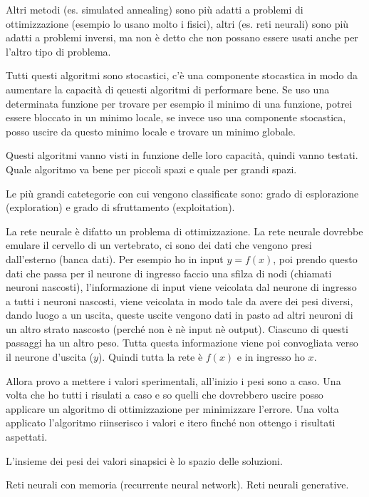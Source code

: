 Altri metodi (es. simulated annealing) sono più adatti a problemi di ottimizzazione (esempio lo usano 
molto i fisici), altri (es. reti neurali) sono più adatti a problemi inversi, ma non è detto che non 
possano essere usati anche per l'altro tipo di problema.

Tutti questi algoritmi sono stocastici, c'è una componente stocastica in modo da aumentare la 
capacità di qeuesti algoritmi di performare bene.
Se uso una determinata funzione per trovare per esempio il minimo di una funzione, 
potrei essere bloccato in un minimo locale, se invece uso una componente stocastica, 
posso uscire da questo minimo locale e trovare un minimo globale.

Questi algoritmi vanno visti in funzione delle loro capacità, quindi vanno testati.
Quale algoritmo va bene per piccoli spazi e quale per grandi spazi.

Le più grandi catetegorie con cui vengono classificate sono:
grado di esplorazione (exploration) e grado di sfruttamento (exploitation).

La rete neurale è difatto un problema di ottimizzazione.
La rete neurale dovrebbe emulare il cervello di un vertebrato, ci sono dei dati che 
vengono presi dall'esterno (banca dati).
Per esempio ho in input $y=f(x)$, poi prendo questo dati che passa per il neurone di ingresso
faccio una sfilza di nodi (chiamati neuroni nascosti), l'informazione di input viene
veicolata dal neurone di ingresso a tutti i neuroni nascosti, viene veicolata in modo tale
da avere dei pesi diversi, dando luogo a un uscita, queste uscite vengono dati in pasto
ad altri neuroni di un altro strato nascosto (perché non è nè input nè output).
Ciascuno di questi passaggi ha un altro peso.
Tutta questa informazione viene poi convogliata verso il neurone d'uscita ($y$). 
Quindi tutta la rete è $f(x)$ e in ingresso ho $x$.

Allora provo a mettere i valori sperimentali, all'inizio i pesi sono a caso. Una volta che 
ho tutti i risulati a caso e so quelli che dovrebbero uscire posso applicare un algoritmo
di ottimizzazione per minimizzare l'errore. Una volta applicato l'algoritmo riinserisco 
i valori e itero finché non ottengo i risultati aspettati.

L'insieme dei pesi dei valori sinapsici è lo spazio delle soluzioni.

Reti neurali con memoria (recurrente neural network).
Reti neurali generative.
